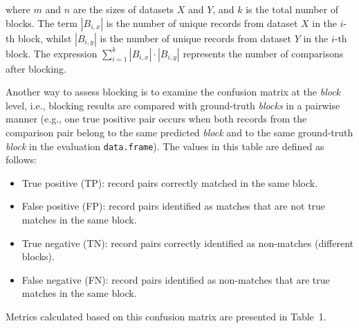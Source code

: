 \noindent where \(m\) and \(n\) are the sizes of datasets \(X\) and \(Y\), and
\(k\) is the total number of blocks. The term \(|B_{i,x}|\) is the number of
unique records from dataset \(X\) in the \(i\)-th block, whilst \(|B_{i,y}|\)
is the number of unique records from dataset \(Y\) in the \(i\)-th block.
The expression \(\sum\limits_{i=1}^{k} |B_{i,x}| \cdot |B_{i,y}|\)
represents the number of comparisons after blocking.

Another way to assess blocking is to examine the confusion matrix at the
\emph{block} level, i.e., blocking results are compared with ground-truth
\emph{blocks} in a pairwise manner (e.g., one true positive pair occurs when
both records from the comparison pair belong to the same predicted
\emph{block} and to the same ground-truth \emph{block} in the evaluation
\texttt{data.frame}). The values in this table are defined as follows:

\begin{itemize}
\tightlist
\item
  True positive (TP): record pairs correctly matched in the same
  block.
\item
  False positive (FP): record pairs identified as matches that are not
  true matches in the same block.
\item
  True negative (TN): record pairs correctly identified as non-matches
  (different blocks).
\item
  False negative (FN): record pairs identified as non-matches that are
  true matches in the same block.
\end{itemize}

Metrics calculated based on this confusion matrix are presented in
Table~1.

